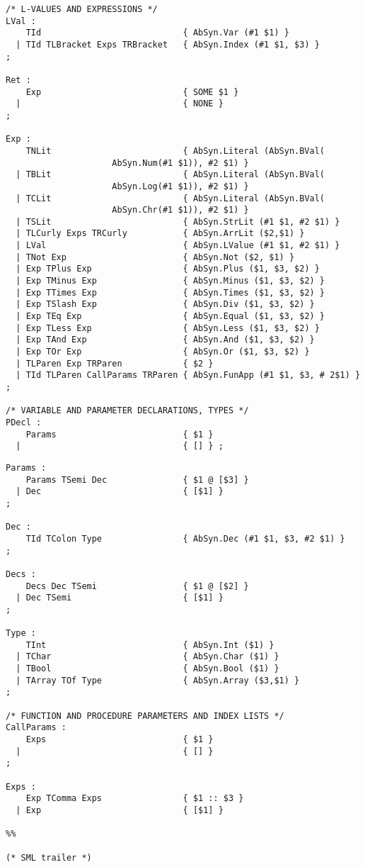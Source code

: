 \documentclass[12pt,a4paper,english]{article}
\begin{document}
\newpage
\begin{lstlisting}[caption=More of the grammar for our Parser.grm. (continued from listing 3)]
/* L-VALUES AND EXPRESSIONS */
LVal :
    TId                            { AbSyn.Var (#1 $1) }
  | TId TLBracket Exps TRBracket   { AbSyn.Index (#1 $1, $3) }
;

Ret :
    Exp                            { SOME $1 }
  |                                { NONE }
;

Exp :
    TNLit                          { AbSyn.Literal (AbSyn.BVal(
				     AbSyn.Num(#1 $1)), #2 $1) }
  | TBLit                          { AbSyn.Literal (AbSyn.BVal(
				     AbSyn.Log(#1 $1)), #2 $1) }
  | TCLit                          { AbSyn.Literal (AbSyn.BVal(
				     AbSyn.Chr(#1 $1)), #2 $1) } 
  | TSLit                          { AbSyn.StrLit (#1 $1, #2 $1) }
  | TLCurly Exps TRCurly           { AbSyn.ArrLit ($2,$1) }
  | LVal                           { AbSyn.LValue (#1 $1, #2 $1) }
  | TNot Exp                       { AbSyn.Not ($2, $1) }
  | Exp TPlus Exp                  { AbSyn.Plus ($1, $3, $2) }
  | Exp TMinus Exp                 { AbSyn.Minus ($1, $3, $2) }
  | Exp TTimes Exp                 { AbSyn.Times ($1, $3, $2) }
  | Exp TSlash Exp                 { AbSyn.Div ($1, $3, $2) }
  | Exp TEq Exp                    { AbSyn.Equal ($1, $3, $2) }
  | Exp TLess Exp                  { AbSyn.Less ($1, $3, $2) }
  | Exp TAnd Exp                   { AbSyn.And ($1, $3, $2) }
  | Exp TOr Exp                    { AbSyn.Or ($1, $3, $2) }
  | TLParen Exp TRParen            { $2 }
  | TId TLParen CallParams TRParen { AbSyn.FunApp (#1 $1, $3, # 2$1) }
;

/* VARIABLE AND PARAMETER DECLARATIONS, TYPES */
PDecl : 
    Params                         { $1 }
  |                                { [] } ;
\end{lstlisting}

\begin{lstlisting}[caption=The last of the grammar for our Parser.grm. (continued from listing 4)]
Params :
    Params TSemi Dec               { $1 @ [$3] }
  | Dec                            { [$1] }
;

Dec :
    TId TColon Type                { AbSyn.Dec (#1 $1, $3, #2 $1) }
;

Decs :
    Decs Dec TSemi                 { $1 @ [$2] }
  | Dec TSemi                      { [$1] }
;

Type :
    TInt                           { AbSyn.Int ($1) }
  | TChar                          { AbSyn.Char ($1) }
  | TBool                          { AbSyn.Bool ($1) }
  | TArray TOf Type                { AbSyn.Array ($3,$1) }
;

/* FUNCTION AND PROCEDURE PARAMETERS AND INDEX LISTS */
CallParams :
    Exps                           { $1 }
  |                                { [] }
;

Exps :
    Exp TComma Exps                { $1 :: $3 }
  | Exp                            { [$1] }

%%

(* SML trailer *)
\end{lstlisting}
\end{document}
